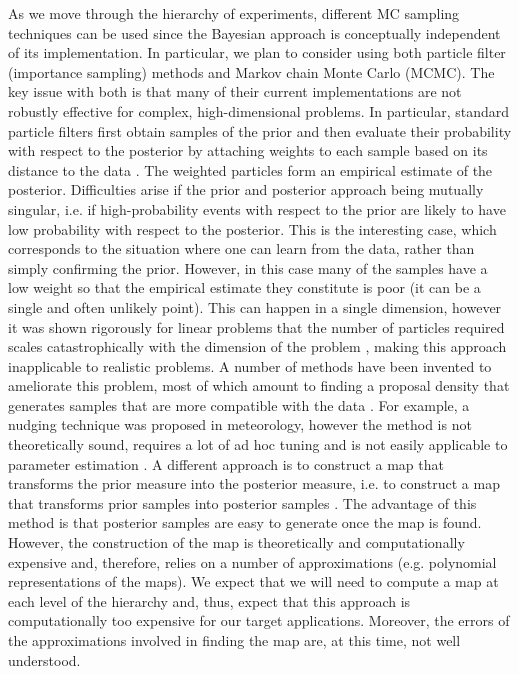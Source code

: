 \documentclass[11pt]{article}
\newcommand{\MarginPar}[1]{\marginpar{%
\vskip-\baselineskip %
\raggedright\tiny\sffamily
\hrule\smallskip{\color{red}#1}\par\smallskip\hrule}}
\begin{document}
As we move through the hierarchy of experiments, different MC sampling techniques can be used since the Bayesian approach is conceptually independent of its implementation. In particular, we plan to consider using both particle filter (importance sampling) methods and Markov chain Monte Carlo (MCMC).\MarginPar{Matti: started review for sampling} The key issue with both is that many  of their current implementations are not robustly effective for complex, high-dimensional problems. In particular, standard particle filters first obtain samples of the prior and then evaluate their probability with respect to the posterior by attaching weights to each sample based on its distance to the data \cite{Doucet2001,GordonSIR}. The weighted particles form an empirical estimate of the posterior. Difficulties arise if the prior and posterior approach being mutually singular, i.e. if high-probability events with respect to the prior are likely to have low probability with respect to the posterior. This is the interesting case, which corresponds to the situation where one can learn from the data, rather than simply confirming the prior. However, in this case many of the samples have a low weight so that the empirical estimate they constitute is poor (it can be a single and often unlikely point). This can happen in a single dimension, however it was shown rigorously for linear problems that the number of particles required scales catastrophically with the dimension of the problem \cite{Bickel,BickelBootstrap,Bickel2,Snyder,Weare2012,Weare2009}, making this approach inapplicable to realistic problems. A number of methods have been invented to ameliorate this problem, most of which amount to finding a proposal density that  generates samples that are more compatible with the data \cite{Doucet,OptimalImportanceFunction,liuchen1995,Brad}. For example, a nudging technique was proposed in meteorology, however the method is not theoretically sound, requires a lot of ad hoc tuning  and is not easily applicable to parameter estimation \cite{vanLeeuwen}. A different approach is to construct a map that transforms the prior measure into the posterior measure, i.e. to construct a map that transforms prior samples into posterior samples \cite{Moselhy2013}. The advantage of this method is that posterior samples are easy to generate once the map is found. However, the construction of the map is theoretically and computationally expensive and, therefore, relies on a number of approximations (e.g. polynomial representations of the maps). We expect that we will need to compute a map at each level of the hierarchy and, thus, expect that this approach is computationally too expensive for our target applications. Moreover, the errors of the approximations involved in finding the map are, at this time, not well understood. 
\end{document}
